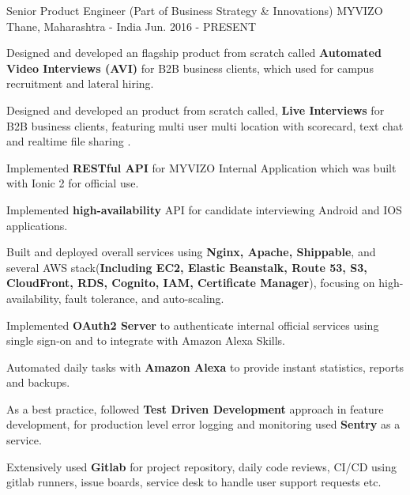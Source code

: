 

\begin{cventries}

  \cventry
    {Senior Product Engineer (Part of Business Strategy \& Innovations)} %
    {MYVIZO} %
    {Thane, Maharashtra - India} %
    {Jun. 2016 - PRESENT} %
    {
      \begin{cvitems} %
        \item {Designed and developed an flagship product from scratch called \textbf{Automated Video Interviews (AVI)} for B2B business clients, which used for campus recruitment and lateral hiring.}
        \item {Designed and developed an product from scratch called, \textbf{ Live Interviews} for B2B business clients, featuring multi user multi location with scorecard, text chat and realtime file sharing .}
        \item {Implemented \textbf{RESTful API} for MYVIZO Internal Application which was built with Ionic 2 for official use.}
        \item {Implemented \textbf{high-availability} API for candidate interviewing Android and IOS applications.}
        \item {Built and deployed overall services using \textbf{Nginx, Apache, Shippable}, and several AWS stack(\textbf{Including EC2, Elastic Beanstalk, Route 53, S3, CloudFront, RDS, Cognito, IAM, Certificate Manager}), focusing on high-availability, fault tolerance, and auto-scaling.}
        \item {Implemented \textbf{OAuth2 Server} to authenticate internal official services using single sign-on and to integrate with Amazon Alexa Skills.}
        \item {Automated daily tasks with \textbf{Amazon Alexa} to provide instant statistics, reports and backups.}
        \item {As a best practice, followed \textbf{Test Driven Development} approach in feature development, for production level error logging and monitoring used \textbf{Sentry} as a service.}
        \item {Extensively used \textbf{Gitlab} for project repository, daily code reviews, CI/CD using gitlab runners, issue boards, service desk to handle user support requests etc. }
      \end{cvitems}
    }


\end{cventries}
